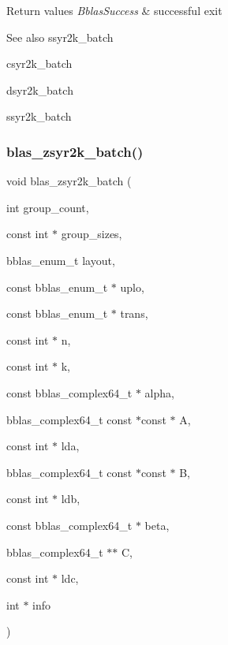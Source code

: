 \begin{DoxyRetVals}{Return values}
{\em Bblas\+Success} & successful exit\\
\hline
\end{DoxyRetVals}
\begin{DoxySeeAlso}{See also}
ssyr2k\+\_\+batch 

csyr2k\+\_\+batch 

dsyr2k\+\_\+batch 

ssyr2k\+\_\+batch 
\end{DoxySeeAlso}
\mbox{\label{group__syr2k__batch_ga89d774447e657a190a94efda61936d09}} 
\subsubsection{\texorpdfstring{blas\+\_\+zsyr2k\+\_\+batch()}{blas\_zsyr2k\_batch()}}
{\footnotesize\ttfamily void blas\+\_\+zsyr2k\+\_\+batch (\begin{DoxyParamCaption}\item[{int}]{group\+\_\+count,  }\item[{const int $\ast$}]{group\+\_\+sizes,  }\item[{bblas\+\_\+enum\+\_\+t}]{layout,  }\item[{const bblas\+\_\+enum\+\_\+t $\ast$}]{uplo,  }\item[{const bblas\+\_\+enum\+\_\+t $\ast$}]{trans,  }\item[{const int $\ast$}]{n,  }\item[{const int $\ast$}]{k,  }\item[{const bblas\+\_\+complex64\+\_\+t $\ast$}]{alpha,  }\item[{bblas\+\_\+complex64\+\_\+t const $\ast$const $\ast$}]{A,  }\item[{const int $\ast$}]{lda,  }\item[{bblas\+\_\+complex64\+\_\+t const $\ast$const $\ast$}]{B,  }\item[{const int $\ast$}]{ldb,  }\item[{const bblas\+\_\+complex64\+\_\+t $\ast$}]{beta,  }\item[{bblas\+\_\+complex64\+\_\+t $\ast$$\ast$}]{C,  }\item[{const int $\ast$}]{ldc,  }\item[{int $\ast$}]{info }\end{DoxyParamCaption})}

